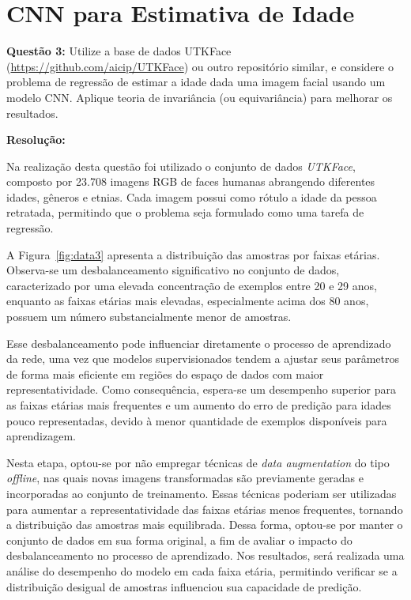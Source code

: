 \section{CNN para Estimativa de Idade}

\textbf{Questão 3:} Utilize a base de dados UTKFace (\url{https://github.com/aicip/UTKFace}) ou outro repositório similar, e considere o problema de regressão de estimar a idade dada uma imagem facial usando um modelo CNN. Aplique teoria de invariância (ou equivariância) para melhorar os resultados.

\textbf{Resolução:} 

Na realização desta questão foi utilizado o conjunto de dados \textit{UTKFace}, composto por 23.708 imagens RGB de faces humanas abrangendo diferentes idades, gêneros e etnias. Cada imagem possui como rótulo a idade da pessoa retratada, permitindo que o problema seja formulado como uma tarefa de regressão.

A Figura~\ref{fig:data3} apresenta a distribuição das amostras por faixas etárias. Observa-se um desbalanceamento significativo no conjunto de dados, caracterizado por uma elevada concentração de exemplos entre 20 e 29 anos, enquanto as faixas etárias mais elevadas, especialmente acima dos 80 anos, possuem um número substancialmente menor de amostras.

Esse desbalanceamento pode influenciar diretamente o processo de aprendizado da rede, uma vez que modelos supervisionados tendem a ajustar seus parâmetros de forma mais eficiente em regiões do espaço de dados com maior representatividade. Como consequência, espera-se um desempenho superior para as faixas etárias mais frequentes e um aumento do erro de predição para idades pouco representadas, devido à menor quantidade de exemplos disponíveis para aprendizagem.

Nesta etapa, optou-se por não empregar técnicas de \textit{data augmentation} do tipo \textit{offline}, nas quais novas imagens transformadas são previamente geradas e incorporadas ao conjunto de treinamento. Essas técnicas poderiam ser utilizadas para aumentar a representatividade das faixas etárias menos frequentes, tornando a distribuição das amostras mais equilibrada. Dessa forma, optou-se por manter o conjunto de dados em sua forma original, a fim de avaliar o impacto do desbalanceamento no processo de aprendizado. Nos resultados, será realizada uma análise do desempenho do modelo em cada faixa etária, permitindo verificar se a distribuição desigual de amostras influenciou sua capacidade de predição.

